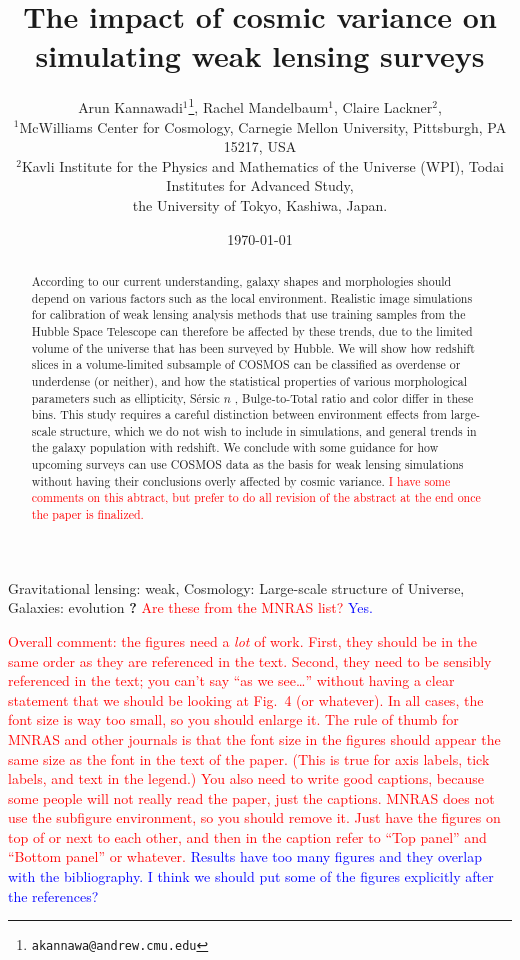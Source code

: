 \documentclass[twocolumn,useAMS,usenatbib]{mn2e}
\title[WL simulation]{The impact of cosmic variance on simulating weak lensing surveys}
\author[Kannawadi et al.]
{Arun Kannawadi$^1$\thanks{\tt akannawa@andrew.cmu.edu}, 
Rachel Mandelbaum$^1$,
Claire Lackner$^2$, 
\\$^1$McWilliams Center for Cosmology, Carnegie Mellon University, Pittsburgh, PA 15217, USA
\\$^2$Kavli Institute for the Physics and Mathematics of the Universe (WPI), Todai Institutes for Advanced Study,\\ the University of Tokyo, Kashiwa, Japan.
}
\date{\today}
\newcommand{\rachel}[1]{{\textcolor{red}{#1}}}
\newcommand{\arun}[1]{{\textcolor{blue}{#1}}}
\newcommand{\sersicn}{S\'{e}rsic $n$ }
\newcommand{\btt}{Bulge-to-Total }
\begin{document}

\maketitle

\begin{abstract}
According to our current understanding, galaxy shapes and morphologies should depend on various factors such as the local environment. Realistic image simulations for calibration of weak lensing analysis methods that use training samples from the Hubble Space Telescope can therefore be affected by these trends, due to the limited volume of the universe that has been surveyed by Hubble. We will show how redshift slices in a volume-limited subsample of COSMOS can be classified as overdense or underdense (or neither), and how the statistical properties of various morphological parameters such as ellipticity, \sersicn, \btt ratio and color differ in these bins. This study requires a careful distinction between environment effects from large-scale structure, which we do not wish to include in simulations, and general trends in the galaxy population with redshift. We conclude with some guidance for how upcoming surveys can use COSMOS data as the basis for weak lensing simulations without having their conclusions overly affected by cosmic variance.  
\rachel{I have some comments on this abtract, but prefer to do all
  revision of the abstract at the end once the paper is finalized.}
\end{abstract}

\begin{keywords}
 Gravitational lensing: weak, Cosmology: Large-scale structure of Universe, Galaxies: evolution {\bf ?} \rachel{Are these from the MNRAS list?} \arun{Yes.}
\end{keywords}

\rachel{Overall comment: the figures need a {\em lot} of work.  First,
  they should be in the same order as they are referenced in the
  text.  Second, they need to be sensibly referenced in the text; you
  can't say ``as we see\dots'' without having a clear statement that
  we should be looking at Fig.~4 (or whatever).  In all
  cases, the font size is way too small, so you should enlarge it.
  The rule of thumb for MNRAS and other journals is that the font size
  in the figures should appear the same size as the font in the text
  of the paper.  (This is true for axis labels, tick labels, and text
  in the legend.)  You also need to write good captions, because some
  people will not really read the paper, just the captions.  MNRAS
  does not use the subfigure environment, so you should remove it.
  Just have the figures on top of or next to each other, and then in
  the caption refer to ``Top panel'' and ``Bottom panel'' or whatever.}
\arun{Results have too many figures and they overlap with the bibliography. I think we should put some of the figures explicitly after the references?}
\end{document}
